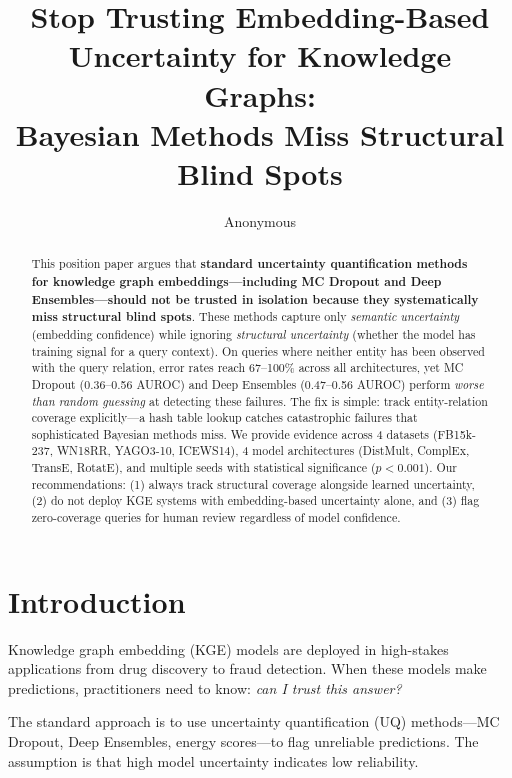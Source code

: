 \documentclass{article}
\title{Stop Trusting Embedding-Based Uncertainty for Knowledge Graphs: \\
Bayesian Methods Miss Structural Blind Spots}
\author{
  Anonymous
}
\begin{document}
\maketitle

\begin{abstract}
This position paper argues that \textbf{standard uncertainty quantification methods for knowledge graph embeddings---including MC Dropout and Deep Ensembles---should not be trusted in isolation because they systematically miss structural blind spots}. These methods capture only \emph{semantic uncertainty} (embedding confidence) while ignoring \emph{structural uncertainty} (whether the model has training signal for a query context). On queries where neither entity has been observed with the query relation, error rates reach 67--100\% across all architectures, yet MC Dropout (0.36--0.56 AUROC) and Deep Ensembles (0.47--0.56 AUROC) perform \emph{worse than random guessing} at detecting these failures. The fix is simple: track entity-relation coverage explicitly---a hash table lookup catches catastrophic failures that sophisticated Bayesian methods miss. We provide evidence across 4 datasets (FB15k-237, WN18RR, YAGO3-10, ICEWS14), 4 model architectures (DistMult, ComplEx, TransE, RotatE), and multiple seeds with statistical significance ($p<0.001$). Our recommendations: (1) always track structural coverage alongside learned uncertainty, (2) do not deploy KGE systems with embedding-based uncertainty alone, and (3) flag zero-coverage queries for human review regardless of model confidence.
\end{abstract}

\section{Introduction}

Knowledge graph embedding (KGE) models are deployed in high-stakes applications from drug discovery to fraud detection. When these models make predictions, practitioners need to know: \emph{can I trust this answer?}

The standard approach is to use uncertainty quantification (UQ) methods---MC Dropout, Deep Ensembles, energy scores---to flag unreliable predictions. The assumption is that high model uncertainty indicates low reliability.
\end{document}
